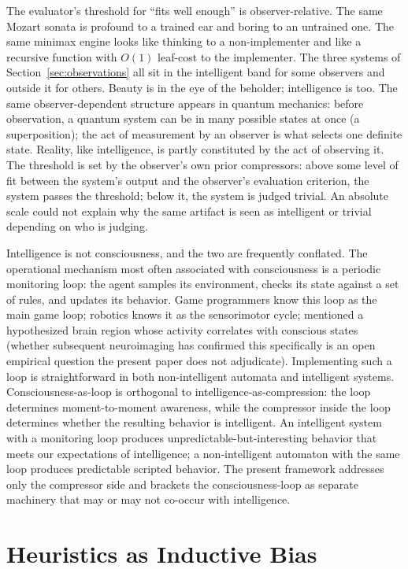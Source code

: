 \documentclass[11pt]{article}
\begin{document}
The evaluator's threshold for ``fits well enough'' is observer-relative. The same Mozart sonata is profound to a trained ear and boring to an untrained one. The same minimax engine looks like thinking to a non-implementer and like a recursive function with $O(1)$ leaf-cost to the implementer. The three systems of Section~\ref{sec:observations} all sit in the intelligent band for some observers and outside it for others. Beauty is in the eye of the beholder; intelligence is too. The same observer-dependent structure appears in quantum mechanics: before observation, a quantum system can be in many possible states at once (a superposition); the act of measurement by an observer is what selects one definite state. Reality, like intelligence, is partly constituted by the act of observing it. The threshold is set by the observer's own prior compressors: above some level of fit between the system's output and the observer's evaluation criterion, the system passes the threshold; below it, the system is judged trivial. An absolute scale could not explain why the same artifact is seen as intelligent or trivial depending on who is judging.

Intelligence is not consciousness, and the two are frequently conflated. The operational mechanism most often associated with consciousness is a periodic monitoring loop: the agent samples its environment, checks its state against a set of rules, and updates its behavior. Game programmers know this loop as the main game loop; robotics knows it as the sensorimotor cycle; \citet{hofstadter1979} mentioned a hypothesized brain region whose activity correlates with conscious states (whether subsequent neuroimaging has confirmed this specifically is an open empirical question the present paper does not adjudicate). Implementing such a loop is straightforward in both non-intelligent automata and intelligent systems. Consciousness-as-loop is orthogonal to intelligence-as-compression: the loop determines moment-to-moment awareness, while the compressor inside the loop determines whether the resulting behavior is intelligent. An intelligent system with a monitoring loop produces unpredictable-but-interesting behavior that meets our expectations of intelligence; a non-intelligent automaton with the same loop produces predictable scripted behavior. The present framework addresses only the compressor side and brackets the consciousness-loop as separate machinery that may or may not co-occur with intelligence.

\section{Heuristics as Inductive Bias}\label{sec:heuristics}
\end{document}
